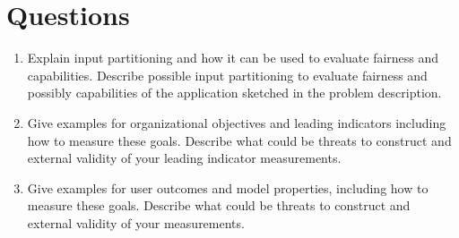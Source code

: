 

\newcommand{\dozenten}{Prof.~Dr.~Steffen Herbold}
\newcommand{\vorlesung}{Principles of AI Engineering}
\newcommand{\docauthor}{Lukas Schulte}
\newcommand{\semester}{}
\newcommand{\blattnummer}{13}
\newcommand{\bistermin}{}


\section*{Questions}

\begin{enumerate}
      \item
            Explain input partitioning and how it can be used to evaluate fairness and capabilities. Describe possible input partitioning to evaluate fairness and possibly capabilities of the application sketched in the problem description.
      \item
            Give examples for organizational objectives and leading indicators including how to measure these goals. Describe what could be threats to construct and external validity of your leading indicator measurements.

      \item
            Give examples for user outcomes and model properties, including how to measure these goals. Describe what could be threats to construct and external validity of your measurements.
\end{enumerate}


